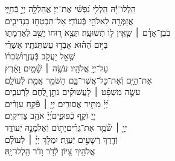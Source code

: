 \documentclass[twoside, openany, parskip=half, 11pt]{book}
\begin{document}
\begin{narrow}

הַֽלְלוּ־יָ֡הּ\hfill \break
הַֽלְלִ֥י נַ֝פְשִׁ֗י אֶת־יְיָ׃ \hfill
אֲהַלְלָ֣ה יְיָ֣ בְּֿחַיָּ֑י \\ אֲזַמְּרָ֖ה לֵאלֹהַ֣י בְּֿעוֹדִֽי׃ \hfill
אַל־תִּבְטְח֥וּ בִנְדִיבִ֑ים \\ בְּֿבֶן־אָדָ֓ם ׀ שֶׁ֤אֵ֖ין ל֥וֹ תְֿשׁוּעָֽה׃ \hfill
תֵּצֵ֣א ר֭וּחוֹ יָשֻׁ֣ב לְֿאַדְמָת֑וֹ \\ בַּיּ֥וֹם הַ֝ה֗וּא אָבְֿד֥וּ עֶשְׁתֹּֽנֹתָֽיו׃ \hfill
אַשְׁרֵ֗י\\ שֶׁ֤אֵ֣ל יַעֲקֹ֣ב בְּֿעֶזְר֑וֹ\hfill שִׂ֝בְר֗וֹ\\ עַל־יְיָ֥ אֱלֹהָֽיו׃ \hfill
עֹשֶׂ֤ה ׀ שָׁ֘מַ֤יִם וָאָ֗רֶץ\\ אֶת־הַיָּ֥ם וְֿאֶת־כׇּל־אֲשֶׁר־בָּ֑ם \hfill הַשֹּׁמֵ֖ר אֱמֶ֣ת לְֿעוֹלָֽם׃ \\
עֹשֶׂ֤ה מִשְׁפָּ֨ט ׀ לָעֲשׁוּקִ֗ים \hfill נֹתֵ֣ן לֶ֭חֶם לָרְֿעֵבִ֑ים\\ יְ֝יָ֗ מַתִּ֥יר אֲסוּרִֽים׃ \hfill
יְיָ֤ ׀ פֹּ֘קֵ֤חַ עִוְרִ֗ים\\ יְיָ֭ זֹקֵ֣ף כְּֿפוּפִ֑ים\hfill יְ֝יָ֗ אֹהֵ֥ב צַדִּיקִֽים׃ \\
יְיָ֤ ׀ שֹׁ֘מֵ֤ר אֶת־גֵּרִ֗ים\hfill יָת֣וֹם וְֿאַלְמָנָ֣ה יְֿעוֹדֵ֑ד\\ וְֿדֶ֖רֶךְ רְֿשָׁעִ֣ים יְֿעַוֵּֽת׃ \hfill
יִמְלֹ֤ךְ יְיָ֨ ׀ לְֿעוֹלָ֗ם\\ אֱלֹהַ֣יִךְ צִ֭יּוֹן לְֿדֹ֥ר וָדֹ֗ר \hfill הַֽלְלוּ־יָֽהּ׃ \\



\end{narrow}
\end{document}
